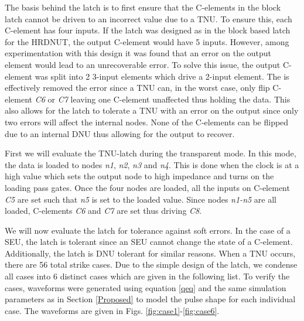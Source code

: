 The basis behind the latch is to first ensure that the C-elements in the block latch cannot be driven to an incorrect value due to a TNU. To ensure this, each C-element has four inputs. If the latch was designed as in the block based latch for the HRDNUT, the output C-element would have 5 inputs. However, among experimentation with this design it was found that an error on the output element would lead to an unrecoverable error. To solve this issue, the output C-element was split into 2 3-input elements which drive a 2-input element. The is effectively removed the error since a TNU can, in the worst case, only flip C-element \textit{C6} or \textit{C7} leaving one C-element unaffected thus holding the data. This also allows for the latch to tolerate a TNU with an error on the output since only two errors will affect the internal nodes. None of the C-elements can be flipped due to an internal DNU thus allowing for the output to recover.

First we will evaluate the TNU-latch during the transparent mode. In this mode, the data is loaded to nodes \textit{n1}, \textit{n2}, \textit{n3} and \textit{n4}. This is done when the clock is at a high value which sets the output node to high impedance and turns on the loading pass gates. Once the four nodes are loaded, all the inputs on C-element \textit{C5} are set such that \textit{n5} is set to the loaded value. Since nodes \textit{n1-n5} are all loaded, C-elements \textit{C6} and \textit{C7} are set thus driving \textit{C8}.

We will now evaluate the latch for tolerance against soft errors. In the case of a SEU, the latch is tolerant since an SEU cannot change the state of a C-element. Additionally, the latch is DNU tolerant for similar reasons. When a TNU occurs, there are 56 total strike cases. Due to the simple design of the latch, we condense all cases into 6 distinct cases which are given in the following list. To verify the cases, waveforms were generated using equation \ref{qeq} and the same simulation parameters as in Section \ref{Proposed} to model the pulse shape for each individual case. The waveforms are given in Figs. \ref{fig:case1}-\ref{fig:case6}.

